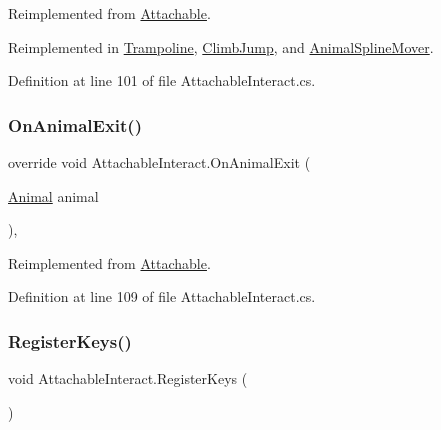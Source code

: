 Reimplemented from \mbox{\hyperlink{class_attachable_a068e297fb6be04b5162db5ce61290020}{Attachable}}.



Reimplemented in \mbox{\hyperlink{class_trampoline_a593abd52ed17139a320ee418aff6b120}{Trampoline}}, \mbox{\hyperlink{class_climb_jump_a66b008bb35c83a5cf66d7f70ca0c4acf}{Climb\+Jump}}, and \mbox{\hyperlink{class_animal_spline_mover_acadeba87020c2abcea749a5a522fff54}{Animal\+Spline\+Mover}}.



Definition at line 101 of file Attachable\+Interact.\+cs.

\mbox{\label{class_attachable_interact_a072c261c7ec9235f62c441fbac876b8f}} 
\subsubsection{\texorpdfstring{On\+Animal\+Exit()}{OnAnimalExit()}}
{\footnotesize\ttfamily override void Attachable\+Interact.\+On\+Animal\+Exit (\begin{DoxyParamCaption}\item[{\mbox{\hyperlink{class_animal}{Animal}}}]{animal }\end{DoxyParamCaption})\hspace{0.3cm}{\ttfamily [protected]}, {\ttfamily [virtual]}}



Reimplemented from \mbox{\hyperlink{class_attachable_a6de7e01430734a291be84f3065b45537}{Attachable}}.



Definition at line 109 of file Attachable\+Interact.\+cs.

\mbox{\label{class_attachable_interact_afdc25b120520c75cf102b314877c498b}} 
\subsubsection{\texorpdfstring{Register\+Keys()}{RegisterKeys()}}
{\footnotesize\ttfamily void Attachable\+Interact.\+Register\+Keys (\begin{DoxyParamCaption}{ }\end{DoxyParamCaption})\hspace{0.3cm}{\ttfamily [protected]}}



